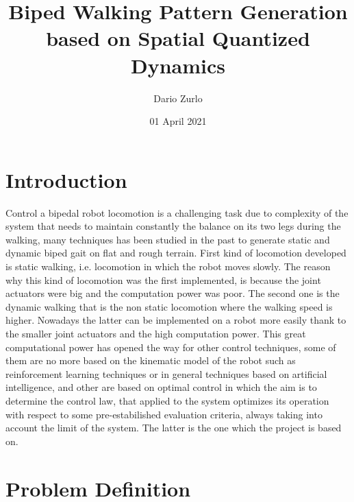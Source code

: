 \documentclass[a4paper]{article}
\title{Biped Walking Pattern Generation based on Spatial Quantized Dynamics}
\author{Dario Zurlo}
\date{01 April 2021}
\begin{document}
\maketitle

\newpage

\section{Introduction}

Control a bipedal robot locomotion is a challenging task due to complexity of the system that needs to maintain constantly the balance on its two legs during the walking, many techniques has been studied in the past to generate static and dynamic biped gait on flat and rough terrain. First kind of locomotion developed is static walking, i.e. locomotion in which the robot moves slowly. The reason why this kind of locomotion was the first implemented, is because the joint actuators were big and the computation power was poor. The second one is the dynamic walking that is the non static locomotion where the walking speed is higher. Nowadays the latter can be implemented on a robot more easily thank to the smaller joint actuators and the high computation power. This great computational power has opened the way for other control techniques, some of them are no more based on the kinematic model of the robot such as reinforcement learning techniques or in general techniques based on artificial intelligence, and other are based on optimal control in which the aim is to determine the control law, that applied to the system optimizes its operation with respect to some pre-estabilished evaluation criteria, always taking into account the limit of the system. The latter is the one  which the project is based on.

\section{Problem Definition}
\end{document}
